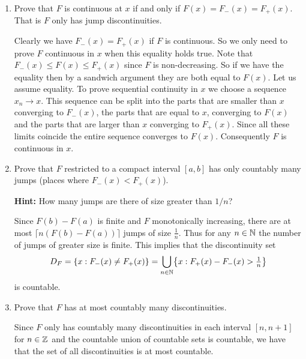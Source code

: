 \begin{exercise}
\begin{enumerate}[label=(\alph*), noitemsep]
        \item\label{it: F continuous if and only if all coincide} Prove that \(F\) is continuous at \(x\) if and only
        if \(F(x) = F_-(x) = F_+(x)\). That is
        \(F\) only has jump discontinuities.
        \begin{solution}
            Clearly we have \(F_-(x) = F_+(x)\) if \(F\) is continuous.  So we
            only need to prove \(F\) continuous in \(x\) when this equality
            holds true.  Note that
            \(F_-(x) \le F(x) \le F_+(x)\) since \(F\) is non-decreasing.
            So if we have the equality then by a sandwich argument they are
            both equal to \(F(x)\). Let us assume equality. To prove
            sequential continuity in \(x\) we choose a sequence \(x_n\to x\).
            This sequence can be split into the parts that are smaller than \(x\)
            converging to \(F_-(x)\), the parts that are equal to \(x\),
            converging to \(F(x)\) and the parts that are larger than \(x\)
            converging to \(F_+(x)\). Since all these limits coincide the entire
            sequence converges to \(F(x)\). Consequently \(F\) is continuous in
            \(x\).
        \end{solution}

        \item Prove that \(F\) restricted to a compact interval \([a,b]\)
        has only countably many jumps (places where \(F_-(x) < F_+(x)\)).

        \textbf{Hint:} How many jumps are there of size greater than \(1/n\)?
        \begin{solution}
            Since \(F(b) - F(a)\) is finite and \(F\) monotonically increasing,
            there are at most \(\lceil n(F(b)-F(a))\rceil\) jumps of size
            \(\frac1n\). Thus for any \(n\in \nat\) the number of jumps of greater
            size is finite. This implies that the discontinuity set
            \[
                D_F = \set{x: F_-(x) \neq F_+(x)} = \bigcup_{n\in \nat} \set[\big]{x: F_+(x) - F_-(x) > \tfrac1n}
            \]
            is countable.
        \end{solution}

        \item Prove that \(F\) has at most countably many discontinuities.
        \begin{solution}
            Since \(F\) only has countably many discontinuities in each
            interval \([n, n+1]\) for \(n\in \integer\) and the countable union
            of countable sets is countable, we have that the set of all
            discontinuities is at most countable.
        \end{solution}
    \end{enumerate}
\end{exercise}

